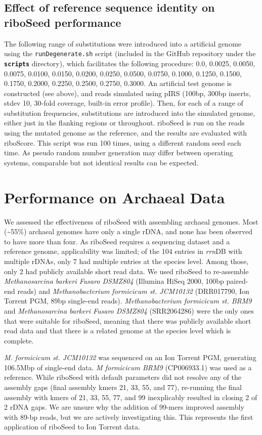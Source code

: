 \documentclass[10pt]{article}
\def \ttilde {\raisebox{-.5ex}\textasciitilde} %
\begin{document}
\subsection*{Effect of reference sequence identity on riboSeed performance}
The following range of substitutions were introduced into a artificial genome using the \texttt{runDegenerate.sh} script (included in the GitHub repository under the \textbf{\texttt{scripts}} directory), which facilitates the following procedure: 0.0, 0.0025, 0.0050, 0.0075, 0.0100, 0.0150, 0.0200, 0.0250, 0.0500, 0.0750, 0.1000, 0.1250, 0.1500, 0.1750, 0.2000, 0.2250, 0.2500, 0.2750, 0.3000. An artificial test genome is constructed (see above), and reads simulated using pIRS (100bp, 300bp inserts, stdev 10, 30-fold coverage, built-in error profile).  Then, for each of a range of substitution frequencies, substitutions are introduced into the simulated genome, either just in the flanking regions or throughout. riboSeed is run on the reads using the mutated genome as the reference, and the results are evaluated with riboScore. This script was run 100 times, using a different random seed each time.  As pseudo random number generation may differ between operating systems, comparable but not identical results can be expected.

\section*{Performance on Archaeal Data}

We assessed the effectiveness of riboSeed with assembling archaeal genomes. Most (\ttilde55\%) archaeal genomes have only a single rDNA, and none has been observed to have more than four. As riboSeed requires a sequencing dataset and a reference genome, applicability was limited; of the 104 entries in \textit{rrn}DB with multiple rDNAs, only 7 had multiple entries at the species level. Among those, only 2 had publicly available short read data. We used riboSeed to re-assemble \textit{Methanosarcina barkeri Fusaro DSMZ804} (Illumina HiSeq 2000, 100bp paired-end reads) and \textit{Methanobacterium formicicum st. JCM10132} (DRR017790, Ion Torrent PGM, 89bp single-end reads). \textit{Methanobacterium formicicum st. BRM9} and \textit{Methanosarcina barkeri Fusaro DSMZ804} (SRR2064286) were the only ones that were suitable for riboSeed, meaning that there was publicly available short read data and that there is a related genome at the species level which is complete.

\textit{M. formicicum st. JCM10132} was sequenced on an Ion Torrent PGM, generating 106.5Mbp of single-end data. \textit{M formicicum BRM9} (CP006933.1) was used as a reference. While riboSeed with default parameters did not resolve any of the assembly gaps (final assembly kmers 21, 33, 55, and 77), re-running the final assembly with kmers of 21, 33, 55, 77, and 99 inexplicably resulted in closing 2 of 2 rDNA gaps. We are unsure why the addition of 99-mers improved assembly with 89-bp reads, but we are actively investigating this. This represents the first application of riboSeed to Ion Torrent data.
\end{document}
